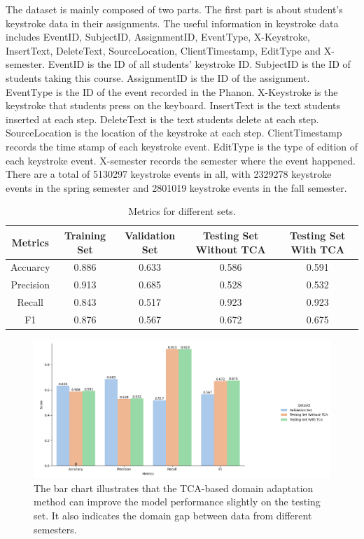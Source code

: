 \documentclass[sigconf,final]{acmart}
\begin{document}
The dataset is mainly composed of two parts. The first part is about student’s keystroke data in their assignments. The useful information in keystroke data includes EventID, SubjectID, AssignmentID, EventType, X-Keystroke, InsertText, DeleteText, SourceLocation, ClientTimestamp, EditType and X-semester. EventID is the ID of all students’ keystroke ID. SubjectID is the ID of students taking this course. AssignmentID is the ID of the assignment. EventType is the ID of the event recorded in the Phanon. X-Keystroke is the keystroke that students press on the keyboard. InsertText is the text students inserted at each step. DeleteText is the text students delete at each step. SourceLocation is the location of the keystroke at each step. ClientTimestamp records the time stamp of each keystroke event. EditType is the type of edition of each keystroke event. X-semester records the semester where the event happened. There are a total of 5130297 keystroke events in all, with 2329278 keystroke events in the spring semester and 2801019 keystroke events in the fall semester. 
\begin{table}[h]
\centering
\caption{Metrics for different sets.}
\begin{tabular}{|c|c|c|c|c|} %
\toprule
Metrics & Training Set &Validation Set &Testing Set Without TCA & Testing Set With TCA\\ \hline
 Accuarcy& 0.886 &0.633 &0.586 & 0.591\\ \hline
 Precision & 0.913 &0.685 &0.528 & 0.532\\ \hline
  Recall & 0.843 &0.517 &0.923 & 0.923\\ \hline
  F1  & 0.876 &0.567 &0.672& 0.675\\ 
\bottomrule
\end{tabular}
\end{table}
\begin{figure}[ht]
  \centering
  \includegraphics[width=\linewidth]{table3.png}
  \caption{The bar chart illustrates that the TCA-based domain adaptation method can improve the model performance slightly on the testing set. It also indicates the domain gap between data from different semesters.}
  \label{fig:imglabel}
\end{figure}
\end{document}
